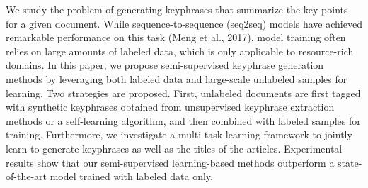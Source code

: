 We study the problem of generating keyphrases that summarize the key points for a given document. While sequence-to-sequence (seq2seq) models have achieved remarkable performance on this task (Meng et al., 2017), model training often relies on large amounts of labeled data, which is only applicable to resource-rich domains. In this paper, we propose semi-supervised keyphrase generation methods by leveraging both labeled data and large-scale unlabeled samples for learning. Two strategies are proposed. First, unlabeled documents are first tagged with synthetic keyphrases obtained from unsupervised keyphrase extraction methods or a self-learning algorithm, and then combined with labeled samples for training. Furthermore, we investigate a multi-task learning framework to jointly learn to generate keyphrases as well as the titles of the articles. Experimental results show that our semi-supervised learning-based methods outperform a state-of-the-art model trained with labeled data only.
